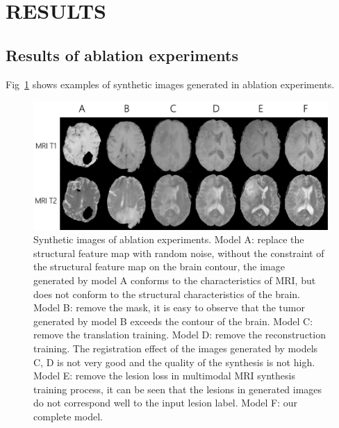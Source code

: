 \documentclass{ecai}
\begin{document}
\section{RESULTS}


\subsection{Results of ablation experiments}
Fig~\ref{ablation} shows examples of synthetic images generated in ablation experiments. 

\begin{figure}
	\centering
	\includegraphics[width=0.98\linewidth]{figures/ablation}
	\caption{Synthetic images of ablation experiments. Model A: replace the structural feature map with random noise, without the constraint of the structural feature map on the brain contour, the image generated by model A conforms to the characteristics of MRI, but does not conform to the structural characteristics of the brain. Model B: remove the mask, it is easy to observe that the tumor generated by model B exceeds the contour of the brain. Model C: remove the translation training. Model D: remove the reconstruction training. The registration effect of the images generated by models C, D is not very good and the quality of the synthesis is not high. Model E: remove the lesion loss in multimodal MRI synthesis training process, it can be seen that the lesions in generated images do not correspond well to the input lesion label. Model F: our complete model.}
	\label{ablation}
\end{figure}
\end{document}
